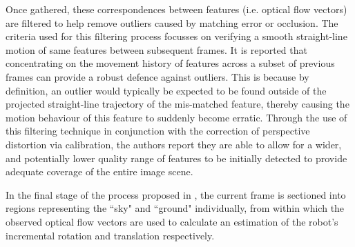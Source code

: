 Once gathered, these correspondences between features (i.e. optical flow vectors) are filtered to help remove outliers caused by matching error or occlusion. The criteria used for this filtering process focusses on verifying a smooth straight-line motion of same features between subsequent frames. It is reported that concentrating on the movement history of features across a subset of previous frames can provide a robust defence against outliers. This is because by definition, an outlier would typically be expected to be found outside of the projected straight-line trajectory of the mis-matched feature, thereby causing the motion behaviour of this feature to suddenly become erratic. Through the use of this filtering technique in conjunction with the correction of perspective distortion via calibration, the authors report they are able to allow for a wider, and potentially lower quality range of features to be initially detected to provide adequate coverage of the entire image scene. 

In the final stage of the process proposed in \cite{campbell}, the current frame is sectioned into regions representing the ``sky" and ``ground" individually, from within which the observed optical flow vectors are used to calculate an estimation of the robot's incremental rotation and translation respectively.


